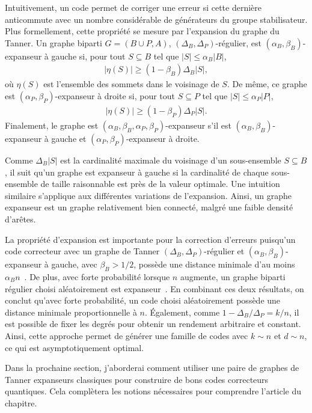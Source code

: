 Intuitivement,
un code permet de corriger une erreur si cette dernière anticommute avec un nombre 
considérable de générateurs du groupe stabilisateur.
Plus formellement,
cette propriété se mesure par l'expansion du graphe du Tanner.
Un graphe biparti $G = (B\cup P, A)$, $(\Delta_B, \Delta_P)$-régulier,
est $(\alpha_B, \beta_B)$-expanseur à gauche si,
pour tout $S \subseteq B$ tel que $|S| \leq \alpha_B |B|$,
\begin{align}
	|\eta(S)| \geq (1 - \beta_B) \Delta_B |S|,
\end{align}
où $\eta(S)$ est l'ensemble des sommets dans le voisinage de $S$.
De même,
ce graphe est $(\alpha_P, \beta_P)$-expanseur à droite si,
pour tout $S \subseteq P$ tel que $|S| \leq \alpha_P |P|$,
\begin{align}
	|\eta(S)| \geq (1 - \beta_P) \Delta_P |S|.
\end{align}
Finalement,
le graphe est $(\alpha_B, \beta_B, \alpha_P, \beta_P)$-expanseur
s'il est $(\alpha_B, \beta_B)$-expanseur à gauche
et $(\alpha_P, \beta_P)$-expanseur à droite.

Comme $\Delta_B|S|$ est la cardinalité maximale du voisinage d'un
sous-ensemble $S \subseteq B$,
il suit qu'un graphe est expanseur à gauche si la cardinalité de 
chaque sous-ensemble de taille raisonnable est près de la valeur optimale.
Une intuition similaire s'applique aux différentes variations de l'expansion.
Ainsi,
un graphe expanseur est un graphe relativement bien connecté,
malgré une faible densité d'arêtes.

La propriété d'expansion est importante pour la correction d'erreurs puisqu'un code correcteur
avec un graphe de Tanner $(\Delta_B, \Delta_P)$-régulier et $(\alpha_B, \beta_B)$-expanseur à gauche,
avec $\beta_B > 1/2$,
possède une distance minimale d'au moins $\alpha_B n$~\cite{sipser_expander_1996}.
De plus,
avec forte probabilité lorsque $n$ augmente,
un graphe biparti régulier choisi aléatoirement est expanseur~\cite{sipser_expander_1996}.
En combinant ces deux résultats,
on conclut qu'avec forte probabilité,
un code choisi aléatoirement possède une distance minimale proportionnelle à $n$.
Également, comme $1 - \Delta_B / \Delta_P = k/n$,
il est possible de fixer les degrés pour obtenir un rendement arbitraire et constant.
Ainsi,
cette approche permet de générer une famille de codes avec $k \sim n$ et $d \sim n$,
ce qui est asymptotiquement optimal.

Dans la prochaine section,
j'aborderai comment utiliser une paire de graphes de Tanner expanseurs classiques
pour construire de bons codes correcteurs quantiques.
Cela complètera les notions nécessaires pour comprendre l'article du chapitre.


